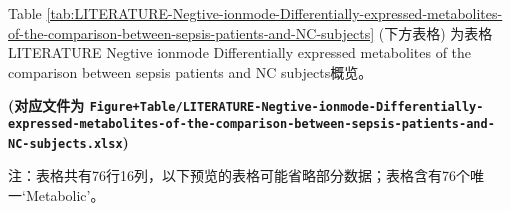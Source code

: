 \documentclass[
]{article}
\begin{document}
Table \ref{tab:LITERATURE-Negtive-ionmode-Differentially-expressed-metabolites-of-the-comparison-between-sepsis-patients-and-NC-subjects} (下方表格) 为表格LITERATURE Negtive ionmode Differentially expressed metabolites of the comparison between sepsis patients and NC subjects概览。

\textbf{(对应文件为 \texttt{Figure+Table/LITERATURE-Negtive-ionmode-Differentially-expressed-metabolites-of-the-comparison-between-sepsis-patients-and-NC-subjects.xlsx})}

\begin{center}\begin{tcolorbox}[colback=gray!10, colframe=gray!50, width=0.9\linewidth, arc=1mm, boxrule=0.5pt]注：表格共有76行16列，以下预览的表格可能省略部分数据；表格含有76个唯一`Metabolic'。
\end{tcolorbox}
\end{center}
\end{document}
